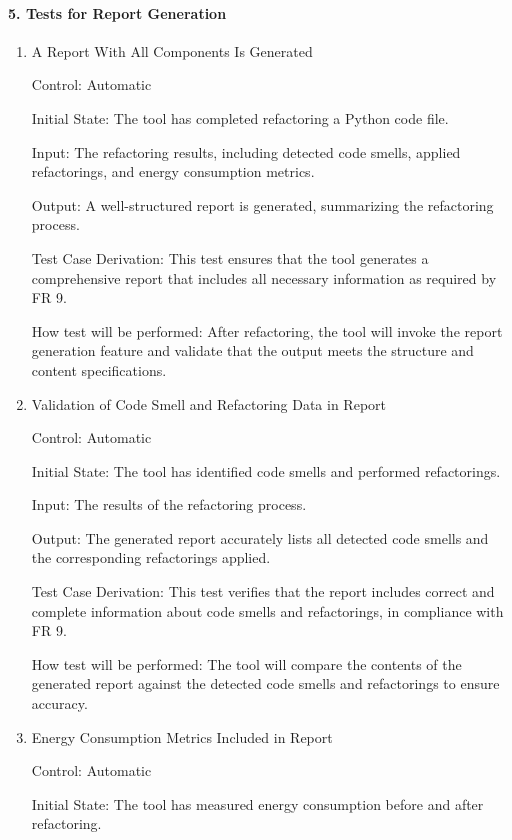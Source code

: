\documentclass[12pt, titlepage]{article}
\begin{document}
\paragraph{5. Tests for Report Generation\\}
\begin{enumerate}
  \item{A Report With All Components Is Generated\\}

Control: Automatic

Initial State: The tool has completed refactoring a Python code file.

Input: The refactoring results, including detected code smells, applied refactorings, and energy consumption metrics.

Output: A well-structured report is generated, summarizing the refactoring process.

Test Case Derivation: This test ensures that the tool generates a comprehensive report that includes all necessary information as required by FR 9.

How test will be performed: After refactoring, the tool will invoke the report generation feature and validate that the output meets the structure and content specifications.


\item{Validation of Code Smell and Refactoring Data in Report\\}

Control: Automatic

Initial State: The tool has identified code smells and performed refactorings.

Input: The results of the refactoring process.

Output: The generated report accurately lists all detected code smells and the corresponding refactorings applied.

Test Case Derivation: This test verifies that the report includes correct and complete information about code smells and refactorings, in compliance with FR 9.

How test will be performed: The tool will compare the contents of the generated report against the detected code smells and refactorings to ensure accuracy.


\item{Energy Consumption Metrics Included in Report\\}

Control: Automatic

Initial State: The tool has measured energy consumption before and after refactoring.


\end{enumerate}
\end{document}
